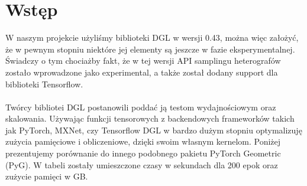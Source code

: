 \documentclass{article}
\begin{document}
\section{Wstęp}
\label{sec:intro}
W naszym projekcie użyliśmy biblioteki DGL w wersji 0.43, można więc założyć, że w pewnym stopniu niektóre jej elementy są jeszcze w fazie eksperymentalnej. Świadczy o tym chociażby fakt, że w tej wersji API samplingu heterografów zostało wprowadzone jako experimental, a także został dodany support dla biblioteki Tensorflow.
\paragraph{}
Twórcy bibliotei DGL postanowili poddać ją testom wydajnościowym oraz skalowania. Używając funkcji tensorowych z backendowych frameworków takich jak PyTorch, MXNet, czy Tensorflow DGL w bardzo dużym stopniu optymalizuję zużycia pamięciowe i obliczeniowe, dzięki swoim własnym kernelom. Poniżej prezentujemy porównanie do innego podobnego pakietu PyTorch Geometric (PyG). W tabeli zostały umieszczone czasy w sekundach dla 200 epok oraz zużycie pamięci w GB.
\end{document}
